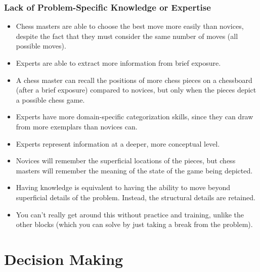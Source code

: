 \documentclass[]{article}
\begin{document}
			\subsubsection{Lack of Problem-Specific Knowledge or Expertise}
				\begin{itemize}
					\item Chess masters are able to choose the best move more easily than novices, despite the fact that they must consider the same number of moves (all possible moves).
					\item Experts are able to extract more information from brief exposure.
					\item A chess master can recall the positions of more chess pieces on a chessboard (after a brief exposure) compared to novices, but only when the pieces depict a possible chess game.
					\item Experts have more domain-specific categorization skills, since they can draw from more exemplars than novices can.
					\item Experts represent information at a deeper, more conceptual level.
					\item Novices will remember the superficial locations of the pieces, but chess masters will remember the meaning of the state of the game being depicted.
					\item Having knowledge is equivalent to having the ability to move beyond superficial details of the problem. Instead, the structural details are retained.
					\item You can't really get around this without practice and training, unlike the other blocks (which you can solve by just taking a break from the problem).
				\end{itemize}

	\section{Decision Making}
\end{document}
